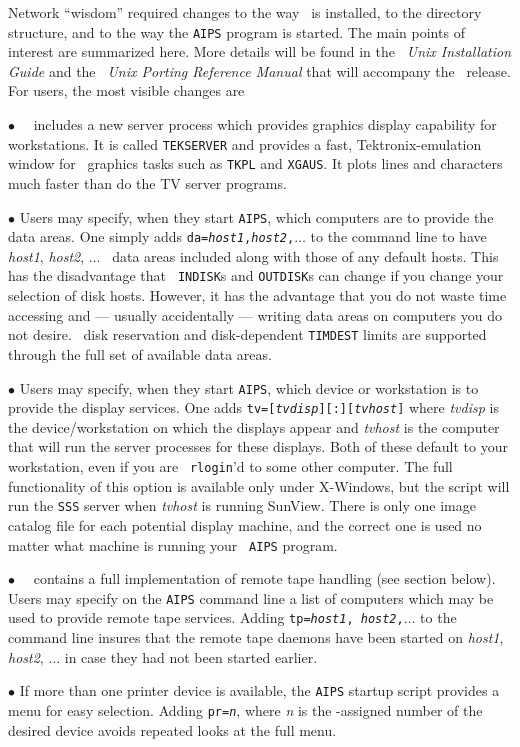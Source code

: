 Network ``wisdom'' required changes to the way \AIPS\ is installed,
to the directory structure, and to the way the {\tt AIPS} program is
started. The main points of interest are summarized here.  More
details will be found in the {\it \AIPS\ Unix Installation Guide\/}
and the {\it \AIPS\ Unix Porting Reference Manual\/} that will accompany
the \RELEASENAME\ release.  For users, the most visible changes are
\begin{description}
\item{$\bullet$} \RELEASENAME\ \AIPS\ includes a new server process
which provides graphics display capability for workstations.  It is
called {\tt TEKSERVER} and provides a fast, Tektronix-emulation window
for \AIPS\ graphics tasks such as {\tt TKPL} and {\tt XGAUS}.  It plots
lines and characters much faster than do the TV server programs.

\item{$\bullet$} Users may specify, when they start {\tt AIPS}, which
computers are to provide the data areas.  One simply adds
{\tt da={\it host1},{\it host2},$\ldots$} to the command line to have
{\it host1}, {\it host2}, $\ldots$ \AIPS\ data areas included along
with those of any default hosts.  This has the disadvantage that {\tt
INDISK}s and {\tt OUTDISK}s can change if you change your selection of
disk hosts.  However, it has the advantage that you do not waste time
accessing and --- usually accidentally --- writing data areas on
computers you do not desire.  \AIPS\ disk reservation and
disk-dependent {\tt TIMDEST} limits are supported through the full set
of available data areas.

\item{$\bullet$} Users may specify, when they start {\tt AIPS}, which
device or workstation is to provide the display services.  One adds
{\tt tv=[{\it tvdisp}][:][{\it tvhost}]} where {\it tvdisp} is the
device/workstation on which the displays appear and {\it tvhost} is
the computer that will run the server processes for these displays.
Both of these default to your workstation, even if you are {\tt
rlogin}'d to some other computer.  The full functionality of this
option is available only under X-Windows, but the script will run
the {\tt SSS} server when {\it tvhost} is running SunView.  There is
only one image catalog file for each potential display machine, and
the correct one is used no matter what machine is running your {\tt
AIPS} program.

\item{$\bullet$} \RELEASENAME\ \AIPS\ contains a full implementation
of remote tape handling (see section below).  Users may specify on the
{\tt AIPS} command line a list of computers which may be used to
provide remote tape services.  Adding {\tt tp={\it host1},{\it
host2},$\ldots$} to the command line insures that the remote tape
daemons have been started on {\it host1}, {\it host2}, $\ldots$
in case they had not been started earlier.

\item{$\bullet$} If more than one printer device is available, the
{\tt AIPS} startup script provides a menu for easy selection.  Adding
{\tt pr={\it n}}, where {\it n} is the \AIPS-assigned number of the
desired device avoids repeated looks at the full menu.
\end{description}
